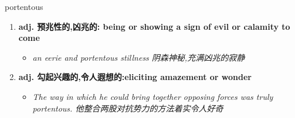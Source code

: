 
\begin{frame}
{\huge portentous}
\begin{center}
\begin{enumerate}\Large
  \item \textbf{adj. 预兆性的,凶兆的: being or showing a sign of evil or calamity to come}
  \begin{itemize}
    \item \em{\Large{an eerie and portentous stillness 阴森神秘,充满凶兆的寂静}}
  \end{itemize}
  \item \textbf{adj. 勾起兴趣的,令人遐想的:eliciting amazement or wonder}
  \begin{itemize}
    \item \em{\Large{The way in which he could bring together opposing forces was truly portentous. 他整合两股对抗势力的方法着实令人好奇}}
  \end{itemize}
\end{enumerate}
\end{center}
\end{frame}
